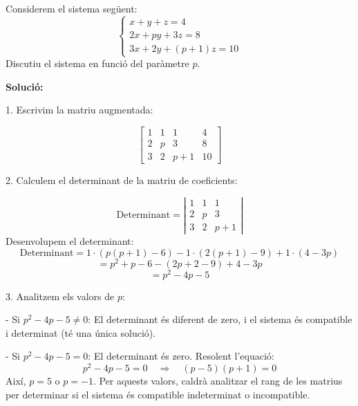 \documentclass[12pt]{article}
\begin{document}
\begin{exemple}
Considerem el sistema següent:
\[
\begin{cases}
x + y + z = 4 \\
2x + py + 3z = 8 \\
3x + 2y + (p+1)z = 10
\end{cases}
\]
Discutiu el sistema en funció del paràmetre \( p \).

\end{exemple}
\begin{exemple}
    
\textbf{Solució:}

\vspace{0.2cm}

1. Escrivim la matriu augmentada:

\[
\left[ \begin{array}{ccc|c}
1 & 1 & 1 & 4 \\
2 & p & 3 & 8 \\
3 & 2 & p+1 & 10
\end{array} \right]
\]

\vspace{0.2cm}

2. Calculem el determinant de la matriu de coeficients:

\[
\text{Determinant} = \left| \begin{array}{ccc}
1 & 1 & 1 \\
2 & p & 3 \\
3 & 2 & p+1
\end{array} \right|
\]
Desenvolupem el determinant:
\[
\text{Determinant} = 1 \cdot \left( p(p+1) - 6 \right) - 1 \cdot \left( 2(p+1) - 9 \right) + 1 \cdot \left( 4 - 3p \right)
\]
\[
= p^2 + p - 6 - (2p + 2 - 9) + 4 - 3p
\]
\[
= p^2 - 4p - 5
\]

\vspace{0.2cm}

3. Analitzem els valors de \( p \):

   - Si \( p^2 - 4p - 5 \neq 0 \): El determinant és diferent de zero, i el sistema és compatible i determinat (té una única solució).

   - Si \( p^2 - 4p - 5 = 0 \): El determinant és zero. Resolent l'equació:
     \[
     p^2 - 4p - 5 = 0 \quad \Rightarrow \quad (p - 5)(p + 1) = 0
     \]
     Així, \( p = 5 \) o \( p = -1 \). Per aquests valors, caldrà analitzar el rang de les matrius per determinar si el sistema és compatible indeterminat o incompatible.

\vspace{0.2cm}


\end{exemple}
\end{document}
